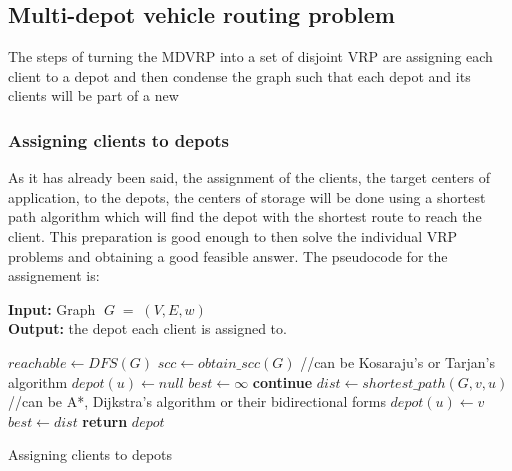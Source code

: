 \documentclass{article}
\begin{document}
\subsection{Multi-depot vehicle routing problem}
The steps of turning the MDVRP into a set of disjoint VRP are assigning each client to a depot and then condense the graph such that each depot and its clients will be part of a new
\subsubsection{Assigning clients to depots}
As it has already been said, the assignment of the clients, the target centers of application, to the depots, the centers of storage will be done using a shortest path algorithm which will find the depot with the shortest route to reach the client. This preparation is good enough to then solve the individual VRP problems and obtaining a good feasible answer. The pseudocode for the assignement is:
\begin{algorithm}
\textbf{Input:} Graph $\;G\;=\;(V, E,w)$\\
\textbf{Output:} the depot each client is assigned to.
\begin{algorithmic}[1]
        \State $reachable \gets DFS(G)$
        \State $scc \gets obtain\_scc(G)$ //can be Kosaraju's or Tarjan's algorithm
            \State $depot(u)\gets null$
        \EndFor
            \State $best \gets \infty$
                    \State \textbf{continue}
                \EndIf
                \State $dist\gets shortest\_path(G,v,u)$ 
                      //can be A*, Dijkstra's algorithm or their bidirectional forms
                    \State $depot(u)\gets v$
                    \State $best \gets dist$
                \EndIf
            \EndFor
        \EndFor
    \State \textbf{return} $depot$
    \EndFunction
\end{algorithmic}
\caption{Assigning clients to depots}
\end{algorithm}
\end{document}
